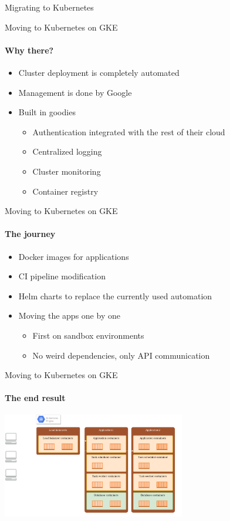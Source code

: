 \documentclass[14pt]{beamer}
\newcommand{\imageframe}[2]{{
  \usebackgroundtemplate{\texttt{[image: \#1]}}
  \begin{frame}{\vspace{-6pt}\usebeamercolor[fg]{item}\huge{#2}}
  \end{frame}
}}
\begin{document}

  \imageframe{images/migrating_cranes.jpg}{Migrating to Kubernetes}

  \begin{frame}{Moving to Kubernetes on GKE}
  \framesubtitle{Why there?}
  \begin{itemize}
    \item Cluster deployment is completely automated
    \item Management is done by Google
    \item Built in goodies
    \begin{itemize}
      \item Authentication integrated with the rest of their cloud
      \item Centralized logging
      \item Cluster monitoring
      \item Container registry
    \end{itemize}
  \end{itemize}
  \end{frame}

  \begin{frame}{Moving to Kubernetes on GKE}
  \framesubtitle{The journey}
  \begin{itemize}
    \item Docker images for applications
    \item CI pipeline modification
    \item Helm charts to replace the currently used automation
    \item Moving the apps one by one
    \begin{itemize}
      \item First on sandbox environments
      \item No weird dependencies, only API communication
    \end{itemize}
  \end{itemize}
  \end{frame}

  \begin{frame}{Moving to Kubernetes on GKE}
  \framesubtitle{The end result}
  \centering
  \includegraphics[width=8cm]{images/kubernetes_diagram.png}
  \end{frame}
\end{document}
